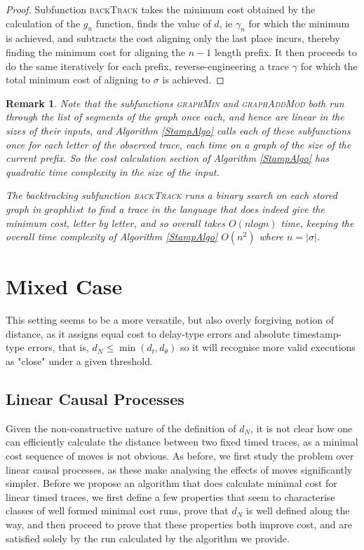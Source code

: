 \documentclass{article}
\newtheorem{remark}{Remark}
\theoremstyle{Definition}
\theoremstyle{definition}
\begin{document}
\begin{proof}
	Subfunction \textsc{backTrack} takes the minimum cost obtained by the calculation of the $g_n$ function, finds the value of $d$, ie $\gamma_n$ for which the minimum is achieved, and subtracts the cost aligning only the last place incurs, thereby finding the minimum cost for aligning the $n-1$ length prefix. 
	It then proceeds to do the same iteratively for each prefix, reverse-engineering a trace $\gamma$ for which the total minimum cost of aligning to $\sigma$ is achieved. 
	
\end{proof}

\begin{remark} Note that the subfunctions \textsc{graphMin} and  \textsc{graphAddMod} both run through the list of segments of the graph once each, and hence are linear in the sizes of their inputs, and Algorithm \ref{StampAlgo} calls each of these subfunctions once for each letter of the observed trace, each time on a graph of the size of the current prefix. 
	So the cost calculation section of Algorithm \ref{StampAlgo} has quadratic time complexity in the size of the input. 
	
	The backtracking subfunction \textsc{backTrack} runs a binary search on each stored graph in $graphlist$ to find a trace in the language that does indeed give the minimum cost, letter by letter, and so overall takes $O(nlogn)$ time, keeping the overall time complexity of Algorithm \ref{StampAlgo} $O(n^2)$ where $n = |\sigma|$.
\end{remark}


	
	\section{Mixed Case} 
			

	This setting seems to be a more versatile, but also overly forgiving notion of distance, as it assigns equal cost to delay-type errors and absolute timestamp-type errors, that is, $d_N \leq \min(d_t, d_\theta)$ so it will recognise more valid executions as "close" under a given threshold. 
	
	\subsection{Linear Causal Processes} 
	Given the non-constructive nature of the definition of $d_N$, it is not clear how one can efficiently calculate the distance between two fixed timed traces, as a minimal cost sequence of moves is not obvious. 
	As before, we first study the problem over linear causal processes, as these make analysing the effects of moves significantly simpler. 
	Before we propose an algorithm that does calculate minimal cost for linear timed traces, we first define a few properties that seem to characterise classes of well formed minimal cost runs, prove that $d_N$ is well defined along the way, and then proceed to prove that these properties both improve cost, and are satisfied solely by the run calculated by the algorithm we provide. 
	
\end{document}
